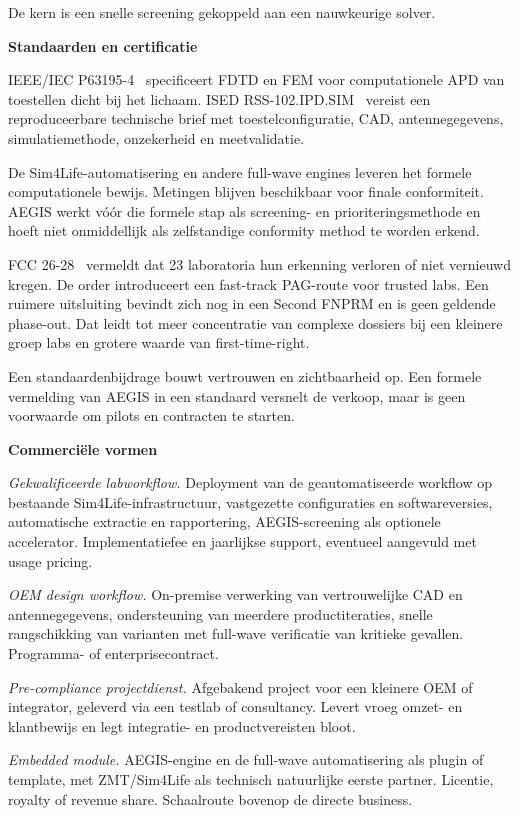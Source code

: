 \documentclass[10pt,a4paper]{article}
\begin{document}
De kern is een snelle screening gekoppeld aan een nauwkeurige solver.

\textbf{Standaarden en certificatie}

IEEE/IEC P63195-4~\cite{ieee_p63195} specificeert FDTD en FEM voor computationele APD van toestellen dicht bij het lichaam. ISED RSS-102.IPD.SIM~\cite{ised_rss102} vereist een reproduceerbare technische brief met toestelconfiguratie, CAD, antennegegevens, simulatiemethode, onzekerheid en meetvalidatie.

De Sim4Life-automatisering en andere full-wave engines leveren het formele computationele bewijs. Metingen blijven beschikbaar voor finale conformiteit. AEGIS werkt vóór die formele stap als screening- en prioriteringsmethode en hoeft niet onmiddellijk als zelfstandige conformity method te worden erkend.

FCC 26-28~\cite{fcc_26_28} vermeldt dat 23 laboratoria hun erkenning verloren of niet vernieuwd kregen. De order introduceert een fast-track PAG-route voor trusted labs. Een ruimere uitsluiting bevindt zich nog in een Second FNPRM en is geen geldende phase-out. Dat leidt tot meer concentratie van complexe dossiers bij een kleinere groep labs en grotere waarde van first-time-right.

Een standaardenbijdrage bouwt vertrouwen en zichtbaarheid op. Een formele vermelding van AEGIS in een standaard versnelt de verkoop, maar is geen voorwaarde om pilots en contracten te starten.

\textbf{Commerciële vormen}

\emph{Gekwalificeerde labworkflow.} Deployment van de geautomatiseerde workflow op bestaande Sim4Life-infra\-struc\-tuur, vast\-ge\-zette configuraties en softwareversies, automatische extractie en rapportering, AEGIS-screening als optionele accelerator. Implementatiefee en jaarlijkse support, eventueel aangevuld met usage pricing.

\emph{OEM design workflow.} On-premise verwerking van vertrouwelijke CAD en antennegegevens, ondersteuning van meerdere productiteraties, snelle rangschikking van varianten met full-wave verificatie van kritieke gevallen. Programma- of enterprisecontract.

\emph{Pre-compliance projectdienst.} Afgebakend project voor een kleinere OEM of integrator, geleverd via een testlab of consultancy. Levert vroeg omzet- en klantbewijs en legt integratie- en productvereisten bloot.

\emph{Embedded module.} AEGIS-engine en de full-wave automatisering als plugin of template, met ZMT/Sim4Life als technisch natuurlijke eerste partner. Licentie, royalty of revenue share. Schaalroute bovenop de directe business.
\end{document}
